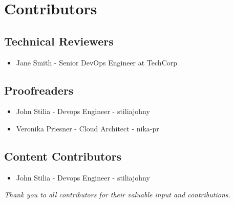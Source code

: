 \chapter*{Contributors}
\section*{Technical Reviewers}
\begin{itemize}[noitemsep]
    \item Jane Smith - Senior DevOps Engineer at TechCorp
\end{itemize}

\section*{Proofreaders}
\begin{itemize}[noitemsep]
    \item John Stilia - Devops Engineer - stiliajohny
    \item Veronika Priesner - Cloud Architect - nika-pr

\end{itemize}

\section*{Content Contributors}
\begin{itemize}[noitemsep]
    \item John Stilia - Devops Engineer - stiliajohny
\end{itemize}

\vspace{0.5cm}
\begin{center}
\small\emph{Thank you to all contributors for their valuable input and contributions.}
\end{center}

\clearpage